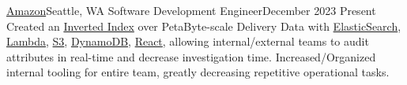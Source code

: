 \resumeSubheading
{\href{https://www.amazon.jobs/en/teams/last-mile}{Amazon}}{Seattle, WA}
{Software Development Engineer}{December 2023 \textemdash Present}
\resumeItemListStart
{}
{Created an \href{https://en.wikipedia.org/wiki/Inverted_index}{Inverted Index} over PetaByte-scale Delivery Data with \href{https://aws.amazon.com/opensearch-service/}{ElasticSearch}, \href{https://aws.amazon.com/lambda/}{Lambda}, \href{https://aws.amazon.com/s3/}{S3}, \href{https://aws.amazon.com/dynamodb/}{DynamoDB}, \href{https://react.dev/}{React}, allowing internal/external teams to audit attributes in real-time and decrease investigation time.}
{Increased/Organized internal tooling for entire team, greatly decreasing repetitive operational tasks.}
\resumeItemListEnd
